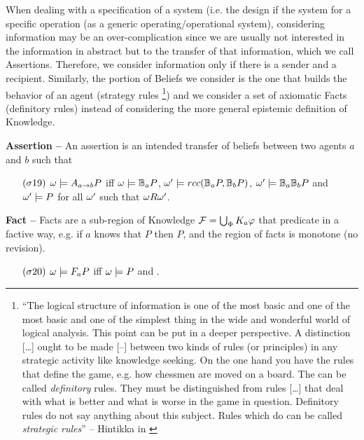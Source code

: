 When dealing with a specification of a system (i.e. the design if the system
for a specific operation (as a generic operating/operational system),
considering information may be an over-complication since we are usually not
interested in the information in abstract but to the transfer of that
information, which we call Assertions. Therefore, we consider information only
if there is a sender and a recipient.  Similarly, the portion of Beliefs we
consider is the one that builds the behavior of an agent (strategy rules
\footnote{``The logical
structure of information is one of the most basic and one of the most basic
and one of the simplest thing in the wide and wonderful world of logical
analysis. This point can be put in a deeper perspective. A distinction [\ldots] ought to
be made [--] between two kinds of rules (or principles) in any strategic activity like
knowledge seeking. On the one hand you have the rules that define the game, e.g. how
chessmen are moved on a board. The can be called \emph{definitory} rules.
They must be distinguished from rules [\ldots] that deal with what is better and what is worse
in the game in question. Definitory rules do not say anything about this subject. Rules
which do can be called \emph{strategic rules}'' -- Hintikka in \autocite{Hintikka1993Information}}) 
and we consider a set
of axiomatic Facts (definitory rules) instead of considering the more general 
epistemic definition of Knowledge.

\begin{definition}{\bf Assertion -- }\label{def:assertion}
	An assertion is an intended transfer of beliefs between
	two agents $a$ and $b$ such that
	\begin{enumerate}[noitemsep]
		\item[$(\sigma19)$] $\omega\models A_{a\rightarrow b}P$ iff
			$\omega\models\mathbb{B}_{a}{P}$, 
			$\omega'\models rcc(\mathbb{B}_{a}{P},\mathbb{B}_{b}{P})$, 
			$\omega'\models\mathbb{B}_{a}{\mathbb{B}_{b}{P}}$
			and $\omega'\models P$ for all
			$\omega'$ such that $\omega R\omega'$.
	\end{enumerate}
\end{definition}

\begin{definition}{\bf Fact -- }\label{def:fact}
Facts are a sub-region of Knowledge $\mathcal{F} = \bigcup_\Phi K_{a}\varphi$
	that predicate in a factive way, e.g.
	if $a$ knows that $P$ then $P$, and the region of facts is monotone (no revision).
	\begin{enumerate}[noitemsep]
		\item[$(\sigma20)$] $\omega\models F_{a}P$ iff
			$\omega \models P$ and 
		.
	\end{enumerate}
\end{definition}

